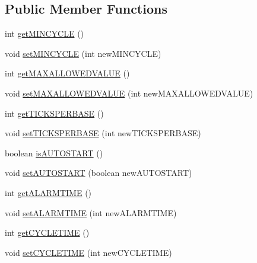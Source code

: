 \subsection*{Public Member Functions}
\begin{DoxyCompactItemize}
\item 
int \hyperlink{classshootingmachineemfmodel_1_1impl_1_1_alarm_impl_aac505ee5c09efc58d74135ed3c549009}{get\-M\-I\-N\-C\-Y\-C\-L\-E} ()
\item 
void \hyperlink{classshootingmachineemfmodel_1_1impl_1_1_alarm_impl_a3a661fdc0bb0798b422dd01d9630814f}{set\-M\-I\-N\-C\-Y\-C\-L\-E} (int new\-M\-I\-N\-C\-Y\-C\-L\-E)
\item 
int \hyperlink{classshootingmachineemfmodel_1_1impl_1_1_alarm_impl_a4b4fd8f246341c47e1469cb78ac1fd7b}{get\-M\-A\-X\-A\-L\-L\-O\-W\-E\-D\-V\-A\-L\-U\-E} ()
\item 
void \hyperlink{classshootingmachineemfmodel_1_1impl_1_1_alarm_impl_a86d04829cc9773ffbc15de86adc0da3a}{set\-M\-A\-X\-A\-L\-L\-O\-W\-E\-D\-V\-A\-L\-U\-E} (int new\-M\-A\-X\-A\-L\-L\-O\-W\-E\-D\-V\-A\-L\-U\-E)
\item 
int \hyperlink{classshootingmachineemfmodel_1_1impl_1_1_alarm_impl_aefdf43cc7e5b3ceae03f889f613e7522}{get\-T\-I\-C\-K\-S\-P\-E\-R\-B\-A\-S\-E} ()
\item 
void \hyperlink{classshootingmachineemfmodel_1_1impl_1_1_alarm_impl_aec664170d257fedd50991d76fc22da59}{set\-T\-I\-C\-K\-S\-P\-E\-R\-B\-A\-S\-E} (int new\-T\-I\-C\-K\-S\-P\-E\-R\-B\-A\-S\-E)
\item 
boolean \hyperlink{classshootingmachineemfmodel_1_1impl_1_1_alarm_impl_abf52c0d2ad03e0367f3f315a4683c14f}{is\-A\-U\-T\-O\-S\-T\-A\-R\-T} ()
\item 
void \hyperlink{classshootingmachineemfmodel_1_1impl_1_1_alarm_impl_abd3759645016630203741ee5dbca791d}{set\-A\-U\-T\-O\-S\-T\-A\-R\-T} (boolean new\-A\-U\-T\-O\-S\-T\-A\-R\-T)
\item 
int \hyperlink{classshootingmachineemfmodel_1_1impl_1_1_alarm_impl_ac79556c6b3f364973719c580860200b3}{get\-A\-L\-A\-R\-M\-T\-I\-M\-E} ()
\item 
void \hyperlink{classshootingmachineemfmodel_1_1impl_1_1_alarm_impl_a71ad6d3099df94662fd305268aa4be9a}{set\-A\-L\-A\-R\-M\-T\-I\-M\-E} (int new\-A\-L\-A\-R\-M\-T\-I\-M\-E)
\item 
int \hyperlink{classshootingmachineemfmodel_1_1impl_1_1_alarm_impl_a5bf352e51eec89bd76092fb853ddde24}{get\-C\-Y\-C\-L\-E\-T\-I\-M\-E} ()
\item 
void \hyperlink{classshootingmachineemfmodel_1_1impl_1_1_alarm_impl_abd50bfde6e2d0970b257e0e3876418c4}{set\-C\-Y\-C\-L\-E\-T\-I\-M\-E} (int new\-C\-Y\-C\-L\-E\-T\-I\-M\-E)

\end{DoxyCompactItemize}
